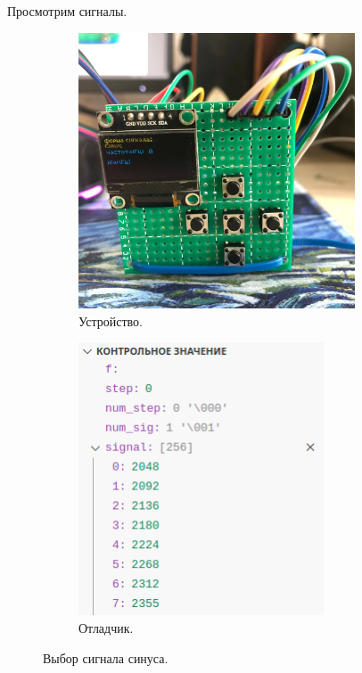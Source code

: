 	Просмотрим сигналы.
	\begin{figure}[H]
     \begin{subfigure}[H]{0.5\textwidth}
         \centering
         \includegraphics[width=0.9\textwidth]{../image/test1_u_s.jpg}
         \caption{Устройство.}
     \end{subfigure}
     \hfill
     \begin{subfigure}[H]{0.5\textwidth}
         \centering
         \includegraphics[width=0.8\textwidth]{../image/test1_o_s.png}
         \caption{Отладчик.}
     \end{subfigure}
        \caption{Выбор сигнала синуса.}
	\end{figure}
	
